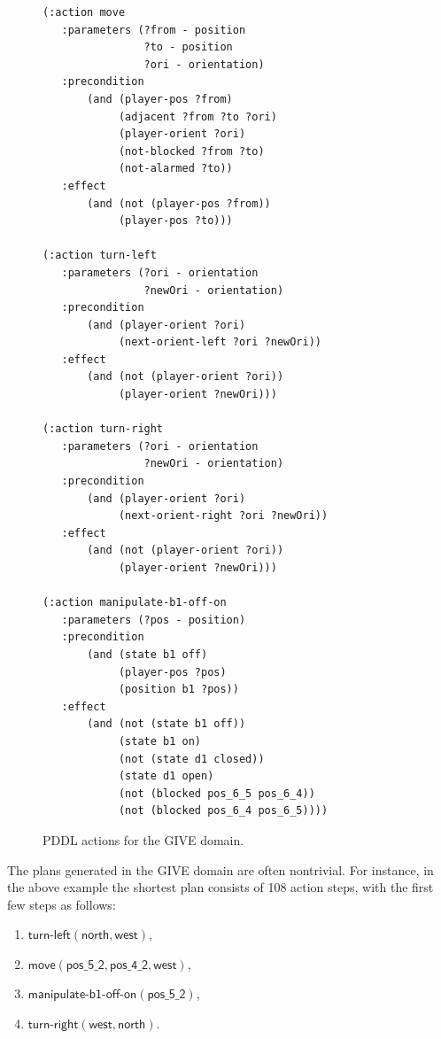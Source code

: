 \documentclass[letterpaper]{article}
\begin{document}
\begin{figure}[p]
\centering
\begin{minipage}{0.5\textwidth}
{\small%
\begin{verbatim}
(:action move
   :parameters (?from - position
                ?to - position
                ?ori - orientation)
   :precondition 
       (and (player-pos ?from) 
            (adjacent ?from ?to ?ori) 
            (player-orient ?ori)
            (not-blocked ?from ?to)
            (not-alarmed ?to))
   :effect 
       (and (not (player-pos ?from))
            (player-pos ?to)))

(:action turn-left
   :parameters (?ori - orientation
                ?newOri - orientation)
   :precondition 
       (and (player-orient ?ori)
            (next-orient-left ?ori ?newOri))
   :effect 
       (and (not (player-orient ?ori))
            (player-orient ?newOri)))

(:action turn-right
   :parameters (?ori - orientation
                ?newOri - orientation)
   :precondition 
       (and (player-orient ?ori)
            (next-orient-right ?ori ?newOri))
   :effect 
       (and (not (player-orient ?ori))
            (player-orient ?newOri)))

(:action manipulate-b1-off-on
   :parameters (?pos - position)
   :precondition 
       (and (state b1 off)
            (player-pos ?pos)
            (position b1 ?pos))
   :effect 
       (and (not (state b1 off))
            (state b1 on)
            (not (state d1 closed))
            (state d1 open) 
            (not (blocked pos_6_5 pos_6_4))
            (not (blocked pos_6_4 pos_6_5))))
\end{verbatim}}%
\end{minipage}
\caption{PDDL actions for the GIVE domain.}
\label{fig:give-planning}
\end{figure}

The plans generated in the GIVE domain are often nontrivial. For instance,
in the above example the shortest plan consists of 108 action steps, with
the first few steps as follows:
%
\begin{enumerate}
\item $\mathsf{turn}\textsf{-}\mathsf{left}(\mathsf{north},
\mathsf{west})$,
\item $\mathsf{move}(\mathsf{pos\_5\_2}, \mathsf{pos\_4\_2}, \mathsf{west})$,
\item $\mathsf{manipulate}\textsf{-}\mathsf{b1}\textsf{-}\mathsf{off}\textsf{-}\mathsf{on}(\mathsf{pos\_5\_2})$,
\item $\mathsf{turn}\textsf{-}\mathsf{right}(\mathsf{west}, \mathsf{north})$.
\end{enumerate}
\end{document}
